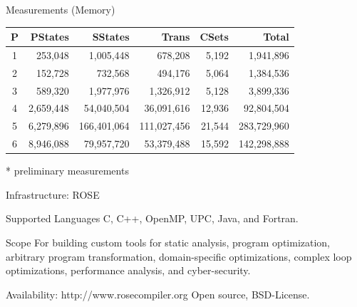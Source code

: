 \begin{frame}{Measurements (Memory)}
\begin{center}
\begin{tabular}{|c|r|r|r|r|r|}\hline
P& PStates & SStates &Trans &CSets& Total \\\hline\hline
1 &253,048 & 1,005,448 & 678,208 & 5,192 & 1,941,896\\\hline
2 &152,728 & 732,568 & 494,176 & 5,064 & 1,384,536\\\hline
3 &589,320 & 1,977,976 & 1,326,912 & 5,128 & 3,899,336\\\hline
4 &2,659,448 & 54,040,504 & 36,091,616 & 12,936 & 92,804,504\\\hline
5 &6,279,896 & 166,401,064 & 111,027,456 & 21,544 & 283,729,960\\\hline
6 &8,946,088 & 79,957,720 & 53,379,488 & 15,592 & 142,298,888\\\hline
\end{tabular}
\end{center}

\vspace{0.5cm}
* preliminary measurements

\end{frame}



\begin{frame}{Infrastructure: ROSE}

\begin{block}{Supported Languages}
C, C++, OpenMP, UPC, Java, and Fortran. 
\end{block}

\begin{block}{Scope}
For building custom tools for static analysis, program optimization, arbitrary program transformation, domain-specific optimizations, complex loop optimizations, performance analysis, and cyber-security.
\end{block}

\begin{block}{Availability: http://www.rosecompiler.org}
Open source, BSD-License.
\end{block}
\end{frame}



